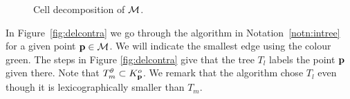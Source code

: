 \documentclass{amsart}
\theoremstyle{definition}
\begin{document}
\begin{figure}[H]
{}
\caption{Cell decomposition of $\mathcal{M}$.}\label{fig:exreps}
\end{figure}

In Figure~\ref{fig:delcontra} we go through the algorithm in Notation~\ref{notn:intree} for a given point $\mathbf{p}\in \mathcal{M}$.
We will indicate the smallest edge using the colour {\green green}.
The steps in Figure \ref{fig:delcontra} give that the tree $T_l$ labels the point $\mathbf{p}$ given there.
Note that $T_m^\theta \subset K_{\mathbf{p}}^o$.
We remark that the algorithm chose $T_l$ even though it is lexicographically smaller than $T_m$. 
\end{document}
